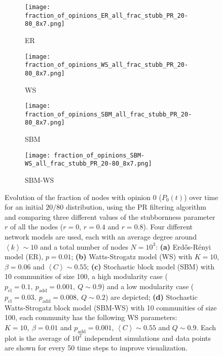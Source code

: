\documentclass[11 pt , letterpaper , twoside , openright]{book}
\begin{document}
\begin{figure}[H]
  \begin{subfigure}[b]{0.49\textwidth}
  	\texttt{[image: fraction\_of\_opinions\_ER\_all\_frac\_stubb\_PR\_20-80\_8x7.png]}
    \caption{ER}
  \end{subfigure}
  \begin{subfigure}[b]{0.49\textwidth}
  	\texttt{[image: fraction\_of\_opinions\_WS\_all\_frac\_stubb\_PR\_20-80\_8x7.png]}
    \caption{WS}
  \end{subfigure}
  \begin{subfigure}[b]{0.49\textwidth}
    \texttt{[image: fraction\_of\_opinions\_SBM\_all\_frac\_stubb\_PR\_20-80\_8x7.png]}
    \caption{SBM}
  \end{subfigure}
  \begin{subfigure}[b]{0.49\textwidth}
    \texttt{[image: fraction\_of\_opinions\_SBM-WS\_all\_frac\_stubb\_PR\_20-80\_8x7.png]}
    \caption{SBM-WS}
  \end{subfigure}
  \captionsetup{format=plain}
  \caption[Evolution of the fraction of nodes with opinion 0 ($P_0(t)$) over time for an initial $20/80$ opinion distribution, using the PR filtering algorithm and comparing three different values of the stubbornness parameter $r$ of all the nodes ($r = 0$, $r = 0.4$ and $r = 0.8$).]{Evolution of the fraction of nodes with opinion 0 ($P_0(t)$) over time for an initial $20/80$ distribution, using the PR filtering algorithm and comparing three different values of the stubbornness parameter $r$ of all the nodes ($r = 0$, $r = 0.4$ and $r = 0.8$). Four different network models are used, each with an average degree around $\left<k\right> \sim 10$ and a total number of nodes $N = 10^3$: \textbf{(a)} Erd\H{o}s-R\'{e}nyi model (ER), $p=0.01$; \textbf{(b)} Watts-Strogatz model (WS) with $K = 10$, $\beta = 0.06$ and $\left<C\right> \sim 0.55$; \textbf{(c)} Stochastic block model (SBM) with 10 communities of size 100, a high modularity case ($p_{\text{cl}} = 0.1,\ p_{\text{add}} = 0.001,\ Q \sim 0.9$) and a low modularity case ($p_{\text{cl}} = 0.03,\ p_{\text{add}} = 0.008,\ Q \sim 0.2$) are depicted; \textbf{(d)} Stochastic Watts-Strogatz block model (SBM-WS) with 10 communities of size 100, each community has the following WS parameters: $K = 10,\ \beta = 0.01$ and $p_{\text{add}} = 0.001$, $\left<C\right> \sim 0.55$ and $Q \sim 0.9$. Each plot is the average of $10^2$ independent simulations and data points are shown for every 50 time steps to improve visualization.}%
\label{ev_op_20_80_all_frac_stubb_PR}
\end{figure}
\noindent
\end{document}
